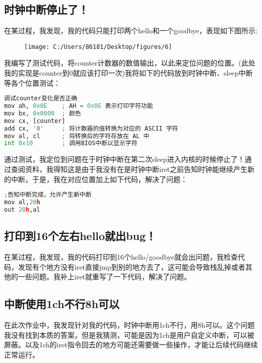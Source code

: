 \documentclass{LabReport}
\begin{document}
	\subsection{时钟中断停止了！}
	在某过程，我发现，我的代码只能打印两个hello和一个goodbye，表现如下图所示:
\begin{figure}[h!]
	\centering
	\texttt{[image: C:/Users/86181/Desktop/figures/6]}
	\caption{}
	\label{fig:6}
\end{figure}
	我编写了测试代码，将counter计数器的数值输出，以此来定位问题的位置。(此处我的实现是counter到0就应该打印一次)我将如下的代码放到时钟中断、sleep中断等各个位置测试：
\begin{lstlisting}[language=python,frame=shadowbox]
调试counter变化是否正确
mov ah, 0x0E    ; AH = 0x0E 表示打印字符功能
mov bx, 0x0000  ; 颜色
mov cx, [counter]
add cx, '0'     ; 将计数器的值转换为对应的 ASCII 字符
mov al, cl      ; 将转换后的字符存放在 AL 中
int 0x10        ; 调用BIOS中断以显示字符
\end{lstlisting}
	通过测试，我定位到问题在于时钟中断在第二次sleep进入内核的时候停止了！通过查阅资料，我得知这是由于我没有在是时钟中断iret之前告知时钟能继续产生新的中断，于是，我在对应位置加上如下代码，解决了问题：
\begin{lstlisting}[language=python,frame=shadowbox]
;告知中断完成，允许产生新中断
mov al,20h
out 20h,al
\end{lstlisting}
	
	\subsection{打印到16个左右hello就出bug！}
	在某过程，我发现，我的代码打印到16个hello/goodbye就会出问题，我检查代码，发现有个地方没有iret直接jmp到别的地方去了，这可能会导致栈乱掉或者其他的一些问题。我补上iret就重写了一下代码，解决了问题。
	
	\subsection{中断使用1ch不行8h可以}
	在此次作业中，我发现针对我的代码，时钟中断用1ch不行，用8h可以。这个问题我没有找到本质的答案，但是我猜测，可能是因为1ch是用户自定义中断，可以被屏蔽。以及1ch的iret指令回去的地方可能还需要做一些操作，才能让后续代码继续正常运行。
	
\end{document}
